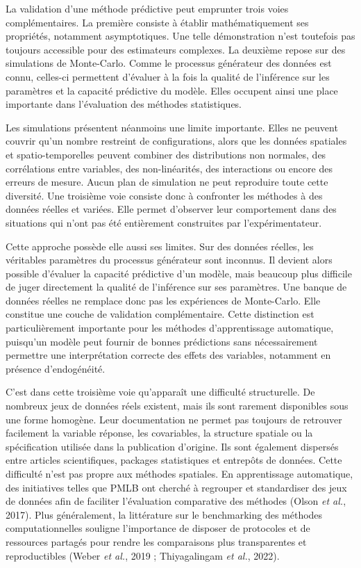 \documentclass[11pt,a4paper]{article}
\begin{document}
La validation d'une méthode prédictive peut emprunter trois voies complémentaires. La première consiste à établir mathématiquement ses propriétés, notamment asymptotiques. Une telle démonstration n'est toutefois pas toujours accessible pour des estimateurs complexes. La deuxième repose sur des simulations de Monte-Carlo. Comme le processus générateur des données est connu, celles-ci permettent d'évaluer à la fois la qualité de l'inférence sur les paramètres et la capacité prédictive du modèle. Elles occupent ainsi une place importante dans l'évaluation des méthodes statistiques.

 Les simulations présentent néanmoins une limite importante. Elles ne peuvent couvrir qu'un nombre restreint de configurations, alors que les données spatiales et spatio-temporelles peuvent combiner des distributions non normales, des corrélations entre variables, des non-linéarités, des interactions ou encore des erreurs de mesure. Aucun plan de simulation ne peut reproduire toute cette diversité. Une troisième voie consiste donc à confronter les méthodes à des données réelles et variées. Elle permet d'observer leur comportement dans des situations qui n'ont pas été entièrement construites par l'expérimentateur.


Cette approche possède elle aussi ses limites. Sur des données réelles, les véritables paramètres du processus générateur sont inconnus. Il devient alors possible d'évaluer la capacité prédictive d'un modèle, mais beaucoup plus difficile de juger directement la qualité de l'inférence sur ses paramètres. Une banque de données réelles ne remplace donc pas les expériences de Monte-Carlo. Elle constitue une couche de validation complémentaire. Cette distinction est particulièrement importante pour les méthodes d'apprentissage automatique, puisqu'un modèle peut fournir de bonnes prédictions sans nécessairement permettre une interprétation correcte des effets des variables, notamment en présence d'endogénéité.


C'est dans cette troisième voie qu'apparaît une difficulté structurelle. De nombreux jeux de données réels existent, mais ils sont rarement disponibles sous une forme homogène. Leur documentation ne permet pas toujours de retrouver facilement la variable réponse, les covariables, la structure spatiale ou la spécification utilisée dans la publication d'origine. Ils sont également dispersés entre articles scientifiques, packages statistiques et entrepôts de données. Cette difficulté n'est pas propre aux méthodes spatiales. En apprentissage automatique, des initiatives telles que PMLB ont cherché à regrouper et standardiser des jeux de données afin de faciliter l'évaluation comparative des méthodes (Olson \textit{et al.}, 2017). Plus généralement, la littérature sur le benchmarking des méthodes computationnelles souligne l'importance de disposer de protocoles et de ressources partagés pour rendre les comparaisons plus transparentes et reproductibles (Weber \textit{et al.}, 2019 ; Thiyagalingam \textit{et al.}, 2022).
\end{document}
